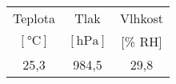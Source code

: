 \begin{tabular}{ccc}                                                    \toprule
Teplota                 &   Tlak                    &   Vlhkost     \\
$[\si{\degreeCelsius}]$ &   $[\si{\hecto\pascal}]$  &   [\% RH]     \\  \midrule
25,3                    &   984,5                   &   29,8        \\  \bottomrule
\end{tabular}
